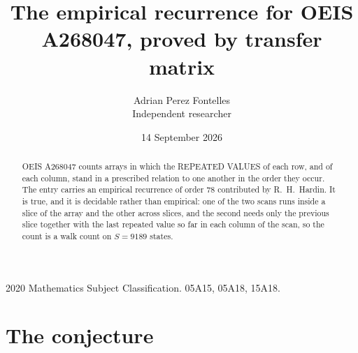 \documentclass[11pt,a4paper]{article}
\title{The empirical recurrence for OEIS A268047, proved by transfer matrix}
\author{Adrian Perez Fontelles\\ \small Independent researcher}
\date{14 September 2026}
\theoremstyle{plain}
\theoremstyle{definition}
\begin{document}
\maketitle

\begin{abstract}
OEIS A268047 counts arrays in which the REPEATED VALUES of each row, and of each column, stand in a
prescribed relation to one another in the order they occur. The entry carries an empirical
recurrence of order $78$ contributed by R.~H.~Hardin. It is true, and it is decidable
rather than empirical: one of the two scans runs inside a slice of the array and the other
across slices, and the second needs only the previous slice together with the last repeated
value so far in each column of the scan, so the count is a walk count on $S=9189$ states.
\end{abstract}

\noindent\small 2020 Mathematics Subject Classification. 05A15, 05A18, 15A18.\normalsize

\section{The conjecture}
\end{document}
